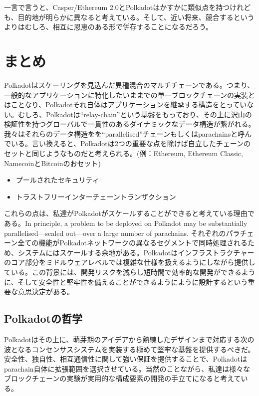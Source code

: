 一言で言うと、Casper/Ethereum
2.0とPolkadotはかすかに類似点を持つけれども、目的地が明らかに異なると考えている。そして、近い将来、競合するというよりはむしろ、相互に恩恵のある形で併存することになるだろう。

\hypertarget{ux307eux3068ux3081}{%
\section{まとめ}\label{ux307eux3068ux3081}}

Polkadotはスケーリングを見込んだ異種混合のマルチチェーンである。つまり、一般的なアプリケーションに特化したいままでの単一ブロックチェーンの実装とはことなり、Polkadotそれ自体はアプリケーションを継承する構造をとっていない。むしろ、Polkadotは``relay-chain''という基盤をもっており、その上に沢山の検証性を持つグローバルで一貫性のあるダイナミックなデータ構造が繋がれる。我々はそれらのデータ構造をを``parallelised''チェーンもしくはparachainsと呼んでいる。言い換えると、Polkadotは2つの重要な点を除けば自立したチェーンのセットと同じようなものだと考えられる。(例：Ethereum,
Ethereum Classic, NamecoinとBitcoinのおセット)

\begin{itemize}
\tightlist
\item
  プールされたセキュリティ
\item
  トラストフリーインターチェーントランザクション
\end{itemize}

これらの点は、私達がPolkadotがスケールすることができると考えている理由である。In
principle, a problem to be deployed on Polkadot may be substantially
parallelised---scaled out---over a large number of parachains.
それぞれのパラチェーン全ての機能がPolkadotネットワークの異なるセグメントで同時処理されるため、システムにはスケールする余地がある。Polkadotはインフラストラクチャーのコア部分をミドルウェアレベルでは複雑な仕様を扱えるようにしながら提供している。この背景には、開発リスクを減らし短時間で効率的な開発ができるように、そして安全性と堅牢性を備えることができるようにように設計するという重要な意思決定がある。

\hypertarget{polkadotux306eux54f2ux5b66}{%
\subsection{Polkadotの哲学}\label{polkadotux306eux54f2ux5b66}}

Polkadotはその上に、萌芽期のアイデアから熟練したデザインまで対応する次の波となるコンセンサスシステムを実装する極めて堅牢な基盤を提供するべきだ。安全性、独自性、相互通信性に関して強い保証を提供することで、Polkadotはparachain自体に拡張範囲を選択させている。当然のことながら、私達は様々なブロックチェーンの実験が実用的な構成要素の開発の手立てになると考えている。

